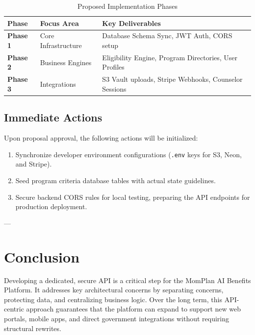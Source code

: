 \documentclass[11pt,a4paper]{article}
\begin{document}
\begin{table}[h]
    \centering
    \caption{Proposed Implementation Phases}
    \vspace{0.2cm}
    \begin{tabular}{lll}
        \toprule
        \textbf{Phase} & \textbf{Focus Area} & \textbf{Key Deliverables} \\
        \midrule
        \textbf{Phase 1} & Core Infrastructure & Database Schema Sync, JWT Auth, CORS setup \\
        \textbf{Phase 2} & Business Engines & Eligibility Engine, Program Directories, User Profiles \\
        \textbf{Phase 3} & Integrations & S3 Vault uploads, Stripe Webhooks, Counselor Sessions \\
        \bottomrule
    \end{tabular}
\end{table}

\subsection{Immediate Actions}
Upon proposal approval, the following actions will be initialized:
\begin{enumerate}
    \item Synchronize developer environment configurations (\texttt{.env} keys for S3, Neon, and Stripe).
    \item Seed program criteria database tables with actual state guidelines.
    \item Secure backend CORS rules for local testing, preparing the API endpoints for production deployment.
\end{enumerate}

---

\section{Conclusion}
Developing a dedicated, secure API is a critical step for the MomPlan AI Benefits Platform. It addresses key architectural concerns by separating concerns, protecting data, and centralizing business logic. Over the long term, this API-centric approach guarantees that the platform can expand to support new web portals, mobile apps, and direct government integrations without requiring structural rewrites.
\end{document}
